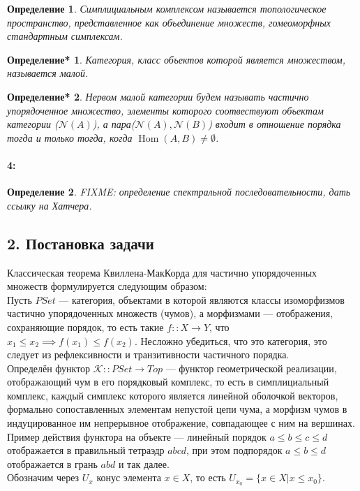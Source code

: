 \documentclass[a4paper,12pt]{report}
\newtheorem{definition}{Определение}
\newtheorem{definition*}{Определение*}
\begin{document}
\begin{definition}
Симплициальным комплексом называется топологическое пространство, представленное как объединение множеств, гомеоморфных стандартным симплексам.
\end{definition}

\begin{definition*}
Категория, класс объектов которой является множеством, называется малой.
\end{definition*}

\begin{definition*}
Нервом малой категории будем называть частично упорядоченное множество, элементы которого соотвествуют объектам категории ($\mathcal{N}(A)$), а пара($\mathcal{N}(A),\mathcal{N}(B)$) входит в отношение порядка тогда и только тогда, когда $\operatorname{Hom}(A,B) \neq \emptyset$.
\end{definition*}

\paragraph*{4:}
\begin{definition}
  FIXME: определение спектральной последовательности, дать ссылку на Хатчера.
\end{definition}

\subsection*{2. Постановка задачи}
Классическая теорема Квиллена-МакКорда для частично упорядоченных множеств формулируется следующим образом:\\

Пусть $PSet$ --- категория, объектами в которой являются классы изоморфизмов частично упорядоченных множеств (чумов), а морфизмами --- отображения, сохраняющие порядок, то есть такие $f :: X \to Y$, что $x_1 \leq x_2 \implies f(x_1) \leq f(x_2)$. Несложно убедиться, что это категория, это следует из рефлексивности и транзитивности частичного порядка.\\
Определён функтор $\mathcal{K} :: PSet \to Top$ --- функтор геометрической реализации, отображающий чум в его порядковый комплекс, то есть в симплициальный комплекс, каждый симплекс которого является линейной оболочкой векторов, формально сопоставленных элементам непустой цепи чума, а морфизм чумов в индуцированное им непрерывное отображение, совпадающее с ним на вершинах.\\
Пример действия функтора на объекте --- линейный порядок $a \leq b \leq c \leq d$ отображается в правильный тетраэдр $abcd$, при этом подпорядок $a \leq b \leq d$ отображается в грань $abd$ и так далее.\\
Обозначим через $U_x$ конус элемента $x \in X$, то есть $U_{x_0} = \{x \in X | x \leq x_0\}$.\\
\end{document}
